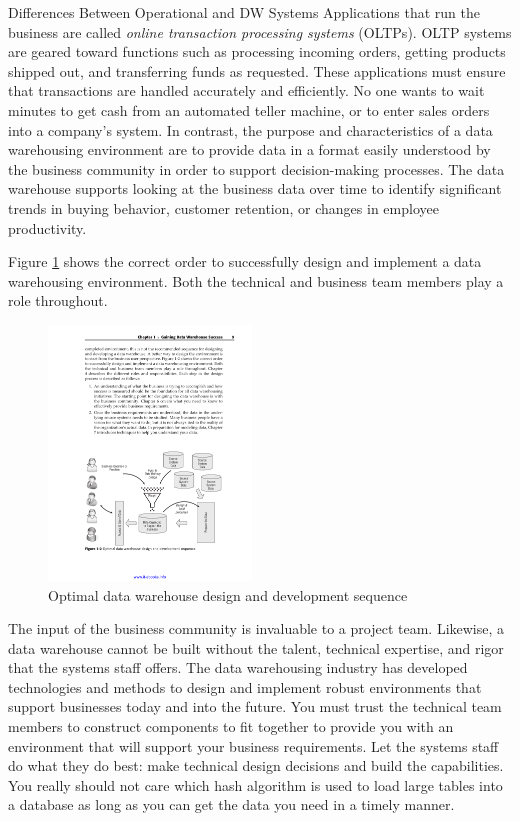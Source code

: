 \documentclass{vldb}
\begin{document}
Differences Between Operational and DW Systems
Applications that run the business are called \textit{online transaction processing systems}
(OLTPs). OLTP systems are geared toward functions such as processing
incoming orders, getting products shipped out, and transferring funds as
requested. These applications must ensure that transactions are handled
accurately and efficiently. No one wants to wait minutes to get cash from
an automated teller machine, or to enter sales orders into a company’s system.
In contrast, the purpose and characteristics of a data warehousing environment
are to provide data in a format easily understood by the business
community in order to support decision-making processes. The data warehouse
supports looking at the business data over time to identify significant
trends in buying behavior, customer retention, or changes in employee productivity.

Figure  \ref{fig:datawarehouse} shows the correct order to successfully design and implement a data warehousing environment. Both
the technical and business team members play a role throughout.

\begin{figure}[htb]
\centering
\includegraphics[width=0.48\textwidth]{datawarehouse}
\caption{Optimal data warehouse design and development sequence}
\label{fig:datawarehouse}
\end{figure}

The input of the business community is invaluable to a project team. Likewise, a data warehouse cannot be built without the talent, technical expertise, and rigor that the systems staff offers. The data warehousing industry has developed technologies and methods to design and implement robust environments that support businesses today and into the future. You must trust the technical team members to construct components to fit together to provide you with an environment that will support your business requirements. Let the systems staff do what they do best: make technical design decisions and build the capabilities. You really should not care which hash algorithm is used to load large tables into a database as long as you can get the data you need in a timely manner.
\end{document}

